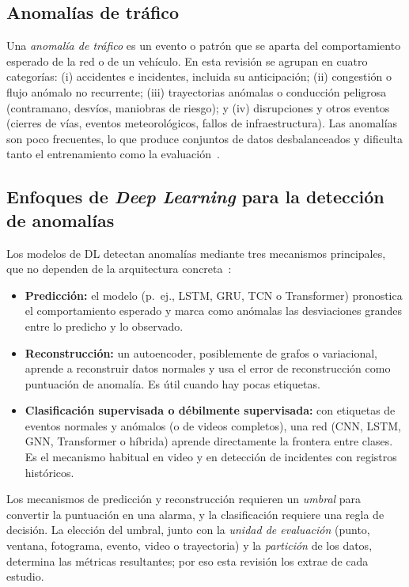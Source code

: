 \documentclass[12pt, a4paper]{article}
\begin{document}
\subsection{Anomalías de tráfico}

Una \textit{anomalía de tráfico} es un evento o patrón que se aparta del comportamiento esperado de la red o de un vehículo. En esta revisión se agrupan en cuatro categorías: (i) accidentes e incidentes, incluida su anticipación; (ii) congestión o flujo anómalo no recurrente; (iii) trayectorias anómalas o conducción peligrosa (contramano, desvíos, maniobras de riesgo); y (iv) disrupciones y otros eventos (cierres de vías, eventos meteorológicos, fallos de infraestructura). Las anomalías son poco frecuentes, lo que produce conjuntos de datos desbalanceados y dificulta tanto el entrenamiento como la evaluación~\cite{darban2024deep}.

\subsection{Enfoques de \textit{Deep Learning} para la detección de anomalías}

Los modelos de DL detectan anomalías mediante tres mecanismos principales, que no dependen de la arquitectura concreta~\cite{darban2024deep}:
\begin{itemize}
  \item \textbf{Predicción:} el modelo (p.~ej., LSTM, GRU, TCN o Transformer) pronostica el comportamiento esperado y marca como anómalas las desviaciones grandes entre lo predicho y lo observado.
  \item \textbf{Reconstrucción:} un autoencoder, posiblemente de grafos o variacional, aprende a reconstruir datos normales y usa el error de reconstrucción como puntuación de anomalía. Es útil cuando hay pocas etiquetas.
  \item \textbf{Clasificación supervisada o débilmente supervisada:} con etiquetas de eventos normales y anómalos (o de videos completos), una red (CNN, LSTM, GNN, Transformer o híbrida) aprende directamente la frontera entre clases. Es el mecanismo habitual en video y en detección de incidentes con registros históricos.
\end{itemize}
Los mecanismos de predicción y reconstrucción requieren un \textit{umbral} para convertir la puntuación en una alarma, y la clasificación requiere una regla de decisión. La elección del umbral, junto con la \textit{unidad de evaluación} (punto, ventana, fotograma, evento, video o trayectoria) y la \textit{partición} de los datos, determina las métricas resultantes; por eso esta revisión los extrae de cada estudio.
\end{document}
